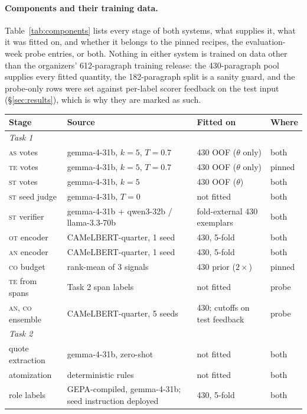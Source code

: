 \documentclass[11pt]{article}
\newcommand{\lab}[1]{\textsc{#1}}
\newcommand{\co}{\lab{co}}
\newcommand{\as}{\lab{as}}
\newcommand{\te}{\lab{te}}
\newcommand{\st}{\lab{st}}
\newcommand{\an}{\lab{an}}
\newcommand{\ot}{\lab{ot}}
\begin{document}
\paragraph{Components and their training data.}
Table~\ref{tab:components} lists every stage of both systems, what
supplies it, what it was fitted on, and whether it belongs to the pinned
recipes, the evaluation-week probe entries, or both. Nothing in either
system is trained on data other than the organizers' 612-paragraph
training release: the 430-paragraph pool supplies every fitted quantity,
the 182-paragraph split is a sanity guard, and the probe-only rows were
set against per-label scorer feedback on the test input
(\S\ref{sec:results}), which is why they are marked as such.

\begin{table}[h]
\centering\scriptsize
\setlength{\tabcolsep}{2.5pt}
\begin{tabular}{p{1.85cm}p{2.15cm}p{1.6cm}l}
\toprule
Stage & Source & Fitted on & Where \\
\midrule
\multicolumn{4}{l}{\emph{Task 1}} \\
\as{} votes & gemma-4-31b, $k{=}5$, $T{=}0.7$ & 430 OOF ($\theta$ only) & both \\
\te{} votes & gemma-4-31b, $k{=}5$, $T{=}0.7$ & 430 OOF ($\theta$ only) & pinned \\
\st{} votes & gemma-4-31b, $k{=}5$ & 430 OOF ($\theta$) & both \\
\st{} seed judge & gemma-4-31b, $T{=}0$ & not fitted & both \\
\st{} verifier & gemma-4-31b + qwen3-32b / llama-3.3-70b & fold-external 430 exemplars & both \\
\ot{} encoder & CAMeLBERT-quarter, 1 seed & 430, 5-fold & both \\
\an{} encoder & CAMeLBERT-quarter, 1 seed & 430, 5-fold & both \\
\co{} budget & rank-mean of 3 signals & 430 prior ($2\times$) & pinned \\
\te{} from spans & Task 2 span labels & not fitted & probe \\
\an, \co{} ensemble & CAMeLBERT-quarter, 5 seeds & 430; cutoffs on test feedback & probe \\
\midrule
\multicolumn{4}{l}{\emph{Task 2}} \\
quote extraction & gemma-4-31b, zero-shot & not fitted & both \\
atomization & deterministic rules & not fitted & both \\
role labels & GEPA-compiled, gemma-4-31b; seed instruction deployed & 430, 5-fold & both \\

\end{tabular}
\end{table}
\end{document}
